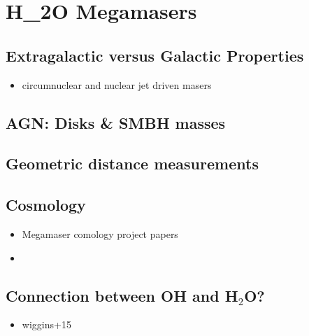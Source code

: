 \section{H_2O Megamasers}
\label{sec:h2o_mm}

\subsection{Extragalactic versus Galactic Properties}
\label{sub:h2o_props}

\begin{itemize}
\item circumnuclear and nuclear jet driven masers
\end{itemize}

\subsection{AGN: Disks \& SMBH masses}
\label{sub:h20_smbh_mass}

\subsection{Geometric distance measurements}
\label{sub:h2o_distance}



\subsection{Cosmology}
\label{sub:h2o_cosmo}

\begin{itemize}
\item Megamaser comology project papers
\item 
\end{itemize}

\subsection{Connection between OH and H$_2$O?}
\label{sec:oh_and_h2o}

\begin{itemize}
\item wiggins+15
\end{itemize}
